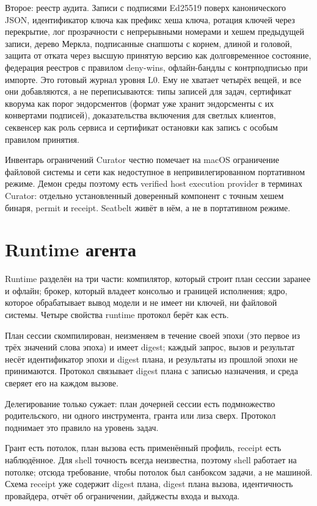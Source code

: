 Второе: реестр аудита. Записи с подписями Ed25519 поверх канонического JSON, идентификатор ключа как префикс хеша ключа, ротация ключей через перекрытие, лог прозрачности с непрерывными номерами и хешем предыдущей записи, дерево Меркла, подписанные снапшоты с корнем, длиной и головой, защита от отката через высшую принятую версию как долговременное состояние, федерация реестров с правилом deny-wins, офлайн-бандлы с контрподписью при импорте. Это готовый журнал уровня L0. Ему не хватает четырёх вещей, и все они добавляются, а не переписываются: типы записей для задач, сертификат кворума как порог эндорсментов (формат уже хранит эндорсменты с их конвертами подписей), доказательства включения для светлых клиентов, секвенсер как роль сервиса и сертификат остановки как запись с особым правилом принятия.

Инвентарь ограничений Curator честно помечает на macOS ограничение файловой системы и сети как недоступное в непривилегированном портативном режиме. Демон среды поэтому есть verified host execution provider в терминах Curator: отдельно установленный доверенный компонент с точным хешем бинаря, permit и receipt. Seatbelt живёт в нём, а не в портативном режиме.

\section{Runtime агента}

Runtime разделён на три части: компилятор, который строит план сессии заранее и офлайн; брокер, который владеет консолью и границей исполнения; ядро, которое обрабатывает вывод модели и не имеет ни ключей, ни файловой системы. Четыре свойства runtime протокол берёт как есть.

План сессии скомпилирован, неизменяем в течение своей эпохи (это первое из трёх значений слова эпоха) и имеет digest; каждый запрос, вызов и результат несёт идентификатор эпохи и digest плана, и результаты из прошлой эпохи не принимаются. Протокол связывает digest плана с записью назначения, и среда сверяет его на каждом вызове.

Делегирование только сужает: план дочерней сессии есть подмножество родительского, ни одного инструмента, гранта или лиза сверх. Протокол поднимает это правило на уровень задач.

Грант есть потолок, план вызова есть применённый профиль, receipt есть наблюдённое. Для shell точность всегда неизвестна, поэтому shell работает на потолке; отсюда требование, чтобы потолок был санбоксом задачи, а не машиной. Схема receipt уже содержит digest плана, digest плана вызова, идентичность провайдера, отчёт об ограничении, дайджесты входа и выхода.

